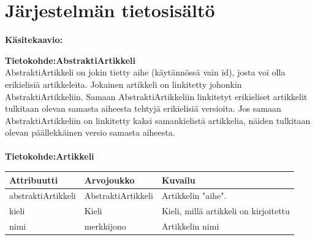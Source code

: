 \documentclass[12pt]{article}
\begin{document}
  \section{Järjestelmän tietosisältö}
        \textbf{Käsitekaavio:} \\

        \textbf{Tietokohde:AbstraktiArtikkeli} \\
        AbstraktiArtikkeli on jokin tietty aihe (käytännössä vain id), josta voi olla erikielisiä artikkeleita. Jokainen artikkeli on linkitetty johonkin AbstraktiArtikkeliin. Samaan AbstraktiArtikkeliin linkitetyt erikieliset artikkelit tulkitaan olevan samasta aiheesta tehtyjä erikielisiä versioita. Jos samaan AbstraktiArtikkeliin on linkitetty kaksi samankielistä artikkelia, näiden tulkitaan olevan päällekkäinen versio samasta aiheesta. \\ \\
        \textbf{Tietokohde:Artikkeli}\\
        \begin{tabular}{|p{8em}|p{8em}|p{13em}|} \hline
            \textbf{Attribuutti} & \textbf{Arvojoukko} & \textbf{Kuvailu} \\ \hline
                    abstraktiArtikkeli
                &   AbstraktiArtikkeli
                &   Artikkelin "aihe".
            \\ \hline
                    kieli
                &   Kieli
                &   Kieli, millä artikkeli on kirjoitettu
            \\ \hline
                    nimi
                &   merkkijono
                &   Artikkelin nimi
            \\ \hline
        \end{tabular} \\ \\ \\
\end{document}
